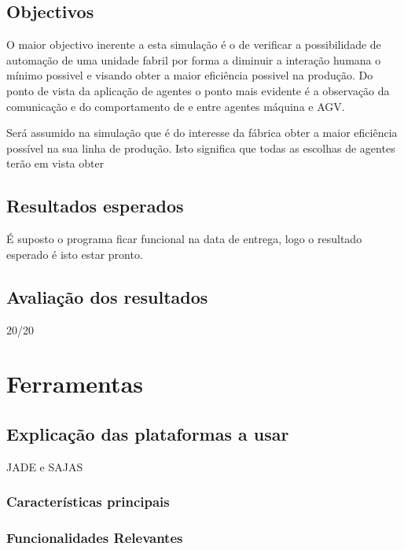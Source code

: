 \begin{titlepage}
\subsection{Objectivos}
\justify\normalsize
O maior objectivo inerente a esta simulação é o de verificar a possibilidade de automação de uma unidade fabril por forma a diminuir a interação humana o mínimo possivel e visando obter a maior eficiência possivel na produção. Do ponto de vista da aplicação de agentes o ponto mais evidente é a observação da comunicação e do comportamento de e entre agentes máquina e AGV. 

Será assumido na simulação que é do interesse da fábrica obter a maior eficiência possível na sua linha de produção. Isto significa que todas as escolhas de agentes terão em vista obter 


\subsection{Resultados esperados}
\justify\normalsize
É suposto o programa ficar funcional na data de entrega, logo o resultado esperado é isto estar pronto.

\subsection{Avaliação dos resultados}
\justify\normalsize
20/20



\section{Ferramentas}

\subsection{Explicação das plataformas a usar}
JADE e SAJAS

\subsubsection{Características principais}


\subsubsection{Funcionalidades Relevantes}



\end{titlepage}
